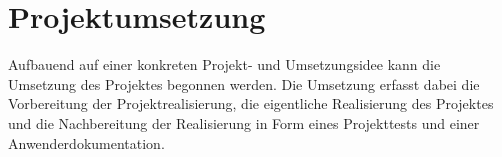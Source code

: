 \section{Projektumsetzung}
\label{sec:Projektumsetzung}

Aufbauend auf einer konkreten Projekt- und Umsetzungsidee kann die Umsetzung des Projektes begonnen werden.
Die Umsetzung erfasst dabei die Vorbereitung der Projektrealisierung, die eigentliche Realisierung des Projektes
und die Nachbereitung der Realisierung in Form eines Projekttests und einer Anwenderdokumentation. 







